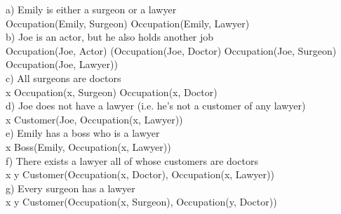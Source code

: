 \documentclass{article}
\begin{document}
a) Emily is either a surgeon or a lawyer\\
Occupation(Emily, \neg Surgeon) \wedge Occupation(Emily, \neg Lawyer)\\

b) Joe is an actor, but he also holds another job\\
Occupation(Joe, Actor) \wedge (Occupation(Joe, Doctor) \vee Occupation(Joe, Surgeon) \vee Occupation(Joe, Lawyer))\\

c) All surgeons are doctors\\
\forall x \: Occupation(x, Surgeon) \Rightarrow Occupation(x, Doctor)\\

d) Joe does not have a lawyer (i.e. he’s not a customer of any lawyer)\\
\exists x \: Customer(Joe, \neg Occupation(x, Lawyer))\\

e) Emily has a boss who is a lawyer\\
\exists x \: Boss(Emily, Occupation(x, Lawyer))\\

f) There exists a lawyer all of whose customers are doctors\\
\exists x \forall y \: Customer(Occupation(x, Doctor), Occupation(x, Lawyer))\\

g) Every surgeon has a lawyer\\
\forall x \exists y \: Customer(Occupation(x, Surgeon), Occupation(y, Doctor))\\
\end{document}
